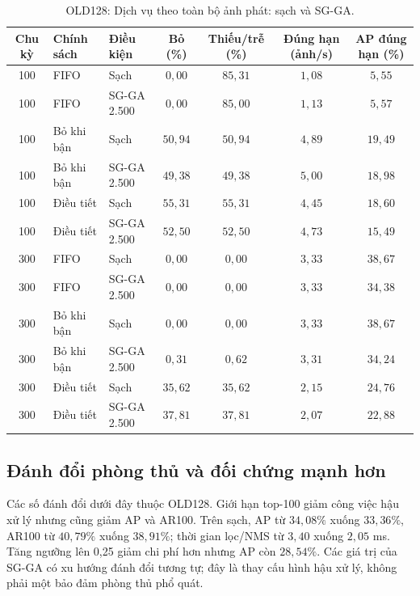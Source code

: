 \documentclass[a4paper,fleqn]{cas-dc}
\begin{document}
\begin{table}[t]
\centering
\small
\caption{OLD128: Dịch vụ theo toàn bộ ảnh phát: sạch và SG-GA.}
\begin{tabularx}{\textwidth}{@{}c X X c c c c@{}}
\toprule
\textbf{Chu kỳ} & \textbf{Chính sách} & \textbf{Điều kiện} & \textbf{Bỏ (\%)} & \textbf{Thiếu/trễ (\%)} & \textbf{Đúng hạn (ảnh/s)} & \textbf{AP đúng hạn (\%)} \\
\midrule
100 & FIFO & Sạch & $0{,}00$ & $85{,}31$ & $1{,}08$ & $5{,}55$ \\
100 & FIFO & SG-GA 2.500 & $0{,}00$ & $85{,}00$ & $1{,}13$ & $5{,}57$ \\
100 & Bỏ khi bận & Sạch & $50{,}94$ & $50{,}94$ & $4{,}89$ & $19{,}49$ \\
100 & Bỏ khi bận & SG-GA 2.500 & $49{,}38$ & $49{,}38$ & $5{,}00$ & $18{,}98$ \\
100 & Điều tiết & Sạch & $55{,}31$ & $55{,}31$ & $4{,}45$ & $18{,}60$ \\
100 & Điều tiết & SG-GA 2.500 & $52{,}50$ & $52{,}50$ & $4{,}73$ & $15{,}49$ \\
300 & FIFO & Sạch & $0{,}00$ & $0{,}00$ & $3{,}33$ & $38{,}67$ \\
300 & FIFO & SG-GA 2.500 & $0{,}00$ & $0{,}00$ & $3{,}33$ & $34{,}38$ \\
300 & Bỏ khi bận & Sạch & $0{,}00$ & $0{,}00$ & $3{,}33$ & $38{,}67$ \\
300 & Bỏ khi bận & SG-GA 2.500 & $0{,}31$ & $0{,}62$ & $3{,}31$ & $34{,}24$ \\
300 & Điều tiết & Sạch & $35{,}62$ & $35{,}62$ & $2{,}15$ & $24{,}76$ \\
300 & Điều tiết & SG-GA 2.500 & $37{,}81$ & $37{,}81$ & $2{,}07$ & $22{,}88$ \\
\bottomrule
\end{tabularx}
\label{tab:stream}
\end{table}

\subsection{Đánh đổi phòng thủ và đối chứng mạnh hơn}

Các số đánh đổi dưới đây thuộc OLD128. Giới hạn top-100 giảm công việc hậu xử lý nhưng cũng giảm AP và AR100. Trên sạch, AP từ $34{,}08\%$ xuống $33{,}36\%$, AR100 từ $40{,}79\%$ xuống $38{,}91\%$; thời gian lọc/NMS từ $3{,}40$ xuống $2{,}05$ ms. Tăng ngưỡng lên 0,25 giảm chi phí hơn nhưng AP còn $28{,}54\%$. Các giá trị của SG-GA có xu hướng đánh đổi tương tự; đây là thay cấu hình hậu xử lý, không phải một bảo đảm phòng thủ phổ quát.
\end{document}
